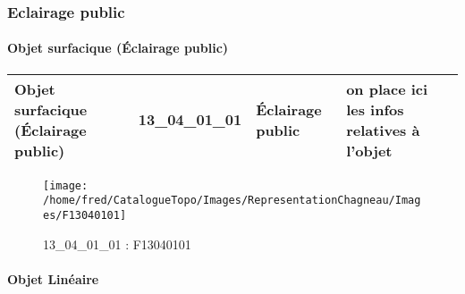 \documentclass[12pt,titlepage,oneside]{book}
\begin{document}
\subsubsection{\large Eclairage public}
\paragraph{Objet surfacique (Éclairage public)}
\noindent
\vspace{\baselineskip}

\renewcommand{\arraystretch}{1.2}
\begin{supertabular}{|p{10cm}|c|p{13cm}|p{12cm}|}
 Objet surfacique (Éclairage public) & 13\_04\_01\_01 & Éclairage public & on place ici les infos relatives à l'objet\\
\hline
\end{supertabular}
\begin{figure}[h!]
  \hfill         %
  \begin{minipage}[t]{3cm}
    \begin{center}
      \texttt{[image: /home/fred/CatalogueTopo/Images/RepresentationChagneau/Images/F13040101]}
      \caption[F13040101]{\label{} 13\_04\_01\_01 : F13040101}
    \end{center}
  \end{minipage}
\end{figure}


\paragraph{Objet Linéaire}
\noindent
\vspace{\baselineskip}
\end{document}
